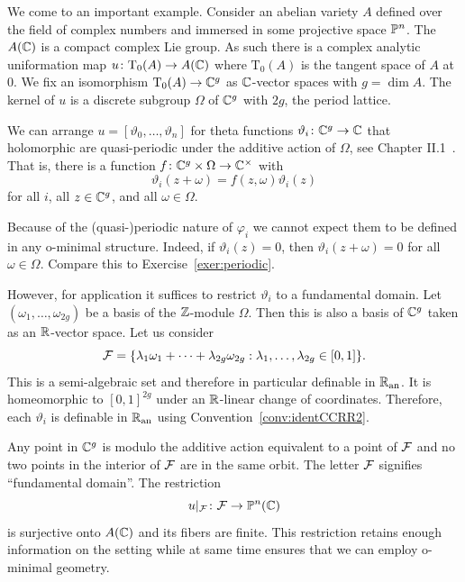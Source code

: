 \begin{example}
  \label{ex:thetafunc}
  We come to an important example. Consider an abelian variety $A$
  defined over the field of complex numbers and immersed in some
  projective space ${\mathbb{P}}^n$.
  The $A({\mathbb{C}})$ is a compact complex Lie group. As such there is a
  complex analytic uniformation map $u\colon \mathrm{T}_0(A) \rightarrow
  A({\mathbb{C}})$
  where $\mathrm{T}_0(A)$ is the tangent space of $A$ at $0$.
  We fix an isomorphism $\mathrm{T}_0(A)\rightarrow{\mathbb{C}}^g$ as
  ${\mathbb{C}}$-vector spaces with $g=\dim A$. The kernel of $u$ is a discrete
  subgroup $\Omega$ of ${\mathbb{C}}^g$ with  $2g$, the period lattice.

  We can arrange $u = [\vartheta_0,\ldots,\vartheta_n]$ for theta
  functions $\vartheta_i \colon {\mathbb{C}}^g \rightarrow{\mathbb{C}}$ that holomorphic
  are quasi-periodic  under the additive action of $\Omega$, see
  Chapter II.1~\cite{MumfordTataLectures}.
  That is, there is a function $f\colon {\mathbb{C}}^g\times \Omega\rightarrow
  {\mathbb{C}}^\times$ with 
  \begin{equation}
    \label{eq:thetatransf}
    \vartheta_i(z+\omega) = f(z,\omega) \vartheta_i(z)
  \end{equation}
  for all $i$, all $z\in{\mathbb{C}}^g$, and all $\omega\in\Omega$. 
  
  Because of the (quasi-)periodic nature of $\varphi_i$ we cannot
  expect them to be defined in any o-minimal structure. Indeed, if
  $\vartheta_i(z)=0$, then $\vartheta_i(z+\omega)=0$ for all
  $\omega\in\Omega$. Compare this to Exercise~\ref{exer:periodic}.
  
  However, for application it suffices to restrict $\vartheta_i$ to a
  fundamental domain. 
  Let $(\omega_1,\ldots,\omega_{2g})$ be a basis of the ${\mathbb{Z}}$-module
  $\Omega$. Then this is also a basis of ${\mathbb{C}}^{g}$ taken as an
  ${\mathbb{R}}$-vector space. Let us consider
  \begin{equation}
    \label{eq:fdav}
    {\mathcal F} = \{\lambda_1\omega_1+\cdots+\lambda_{2g}\omega_{2g} :
  \lambda_1,\ldots,\lambda_{2g}\in [0,1]\}.
  \end{equation}
  This is a semi-algebraic set and therefore in particular definable
  in ${{\mathbb{R}}_{\mathrm{an}}}$. It is homeomorphic to $[0,1]^{2g}$
  under an ${\mathbb{R}}$-linear change of coordinates.
  Therefore, each $\vartheta_i$ is definable in ${{\mathbb{R}}_{\mathrm{an}}}$ using
  Convention~\ref{conv:identCCRR2}. 
  
  Any point in ${\mathbb{C}}^g$ is modulo the additive action
  equivalent to a point of ${\mathcal F}$ and no two points in the interior of ${\mathcal F}$
  are in the same orbit. The letter ${\mathcal F}$ signifies ``fundamental
  domain''. 
  The restriction
  \begin{equation*}
    u|_{{\mathcal F}} \colon {\mathcal F}\rightarrow {\mathbb{P}}^n({\mathbb{C}})
  \end{equation*}
  is surjective onto $A({\mathbb{C}})$ and its fibers are finite.
  This restriction retains enough information on the setting while at
  same time
  ensures that we can employ o-minimal geometry. 


\end{example}
